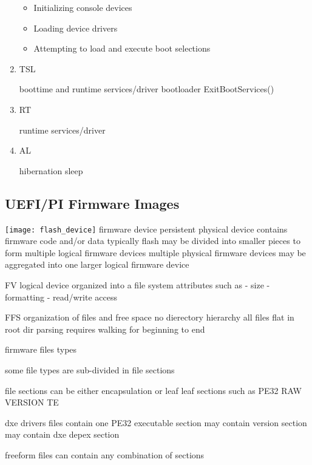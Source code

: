 \begin{enumerate}
    \begin{itemize}
        \item Initializing console devices
        \item Loading device drivers
        \item Attempting to load and execute boot selections
    \end{itemize}

    \item{\acf{TSL}}

    boottime and runtime services/driver
    bootloader
    ExitBootServices()

    \item{\acf{RT}}

    runtime services/driver

    \item{\acf{AL}}

    hibernation
    sleep

\end{enumerate}

\subsection{\acs{UEFI}/\acs{PI} Firmware Images}

\texttt{[image: flash\_device]}
firmware device
persistent
physical device
contains firmware code and/or data
typically flash
may be divided into smaller pieces to form multiple logical firmware devices
multiple physical firmware devices may be aggregated into one larger logical firmware device

\acf{FV}
logical device
organized into a file system
attributes such as
- size
- formatting
- read/write access

\acf{FFS}
organization of files and free space
no dierectory hierarchy
all files flat in root dir
parsing requires walking for beginning to end

firmware files
types

some file types are sub-divided in file sections

file sections can be either
encapsulation or leaf
leaf sections such as
PE32
RAW
VERSION
TE

dxe drivers files
contain one PE32 executable section
may contain version section
may contain dxe depex section

freeform files
can contain any combination of sections

